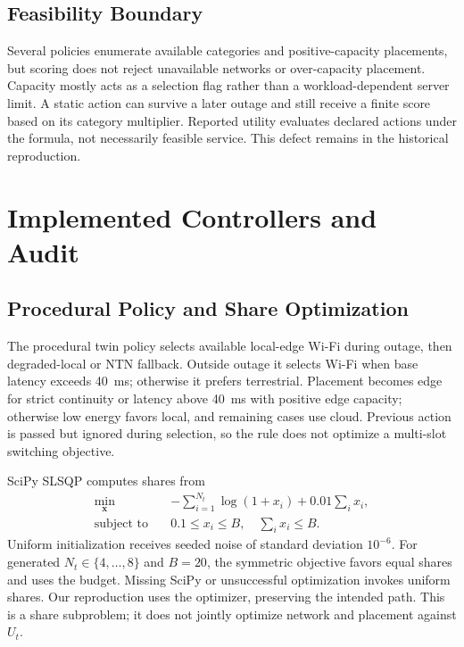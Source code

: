 \documentclass[letterpaper,journal]{IEEEtran}
\begin{document}
\subsection{Feasibility Boundary}
Several policies enumerate available categories and positive-capacity placements, but scoring does not reject unavailable networks or over-capacity placement. Capacity mostly acts as a selection flag rather than a workload-dependent server limit. A static action can survive a later outage and still receive a finite score based on its category multiplier. Reported utility evaluates declared actions under the formula, not necessarily feasible service. This defect remains in the historical reproduction.

\section{Implemented Controllers and Audit}
\subsection{Procedural Policy and Share Optimization}
The procedural twin policy selects available local-edge Wi-Fi during outage, then degraded-local or NTN fallback. Outside outage it selects Wi-Fi when base latency exceeds 40~ms; otherwise it prefers terrestrial. Placement becomes edge for strict continuity or latency above 40~ms with positive edge capacity; otherwise low energy favors local, and remaining cases use cloud. Previous action is passed but ignored during selection, so the rule does not optimize a multi-slot switching objective.

SciPy SLSQP computes shares from
\begin{equation}
\begin{split}
\min_{\boldsymbol{x}}\quad&-\sum_{i=1}^{N_t}\log(1+x_i)+0.01\sum_i x_i,\\
\text{subject to}\quad&0.1\le x_i\le B,\quad\sum_i x_i\le B.
\end{split}\label{eq:slsqp}
\end{equation}
Uniform initialization receives seeded noise of standard deviation $10^{-6}$. For generated $N_t\in\{4,\ldots,8\}$ and $B=20$, the symmetric objective favors equal shares and uses the budget. Missing SciPy or unsuccessful optimization invokes uniform shares. Our reproduction uses the optimizer, preserving the intended path. This is a share subproblem; it does not jointly optimize network and placement against $U_t$.
\end{document}
